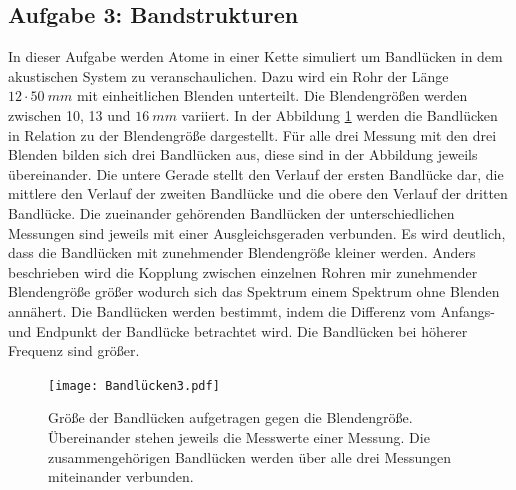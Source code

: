 \subsection{Aufgabe 3: Bandstrukturen}
\FloatBarrier
In dieser Aufgabe werden Atome in einer Kette simuliert um Bandlücken in dem akustischen System zu veranschaulichen.
Dazu wird ein Rohr der Länge $12 \cdot \SI{50}{mm}$ mit einheitlichen Blenden unterteilt.
Die Blendengrößen werden zwischen 10, 13 und $\SI{16}{mm}$ variiert.
In der Abbildung \ref{fig.Aufgabe3} werden die Bandlücken in Relation zu der Blendengröße dargestellt.
Für alle drei Messung mit den drei Blenden bilden sich drei Bandlücken aus, diese sind in der Abbildung jeweils übereinander.
Die untere Gerade stellt den Verlauf der ersten Bandlücke dar, die mittlere den Verlauf der zweiten Bandlücke und die obere den Verlauf der dritten Bandlücke.
Die zueinander gehörenden Bandlücken der unterschiedlichen Messungen sind jeweils mit einer Ausgleichsgeraden verbunden.
Es wird deutlich, dass die Bandlücken mit zunehmender Blendengröße kleiner werden.
Anders beschrieben wird die Kopplung zwischen einzelnen Rohren mir zunehmender Blendengröße größer wodurch sich das Spektrum einem Spektrum ohne Blenden annähert.
Die Bandlücken werden bestimmt, indem die Differenz vom Anfangs- und Endpunkt der Bandlücke betrachtet wird.
Die Bandlücken bei höherer Frequenz sind größer.
\begin{figure}[h!]
  \centering
  \texttt{[image: Bandlücken3.pdf]}
  \caption{Größe der Bandlücken aufgetragen gegen die Blendengröße. Übereinander stehen jeweils die Messwerte einer Messung. Die zusammengehörigen Bandlücken werden über alle drei Messungen miteinander verbunden.}
  \label{fig.Aufgabe3}
\end{figure}
\FloatBarrier

